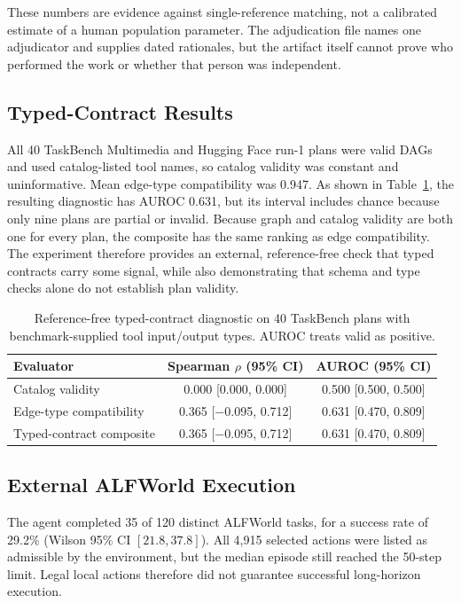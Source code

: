 \documentclass[10pt]{article}
\begin{document}
These numbers are evidence against single-reference matching, not a calibrated
estimate of a human population parameter. The adjudication file names one
adjudicator and supplies dated rationales, but the artifact itself cannot prove
who performed the work or whether that person was independent.

\subsection{Typed-Contract Results}
All 40 TaskBench Multimedia and Hugging Face run-1 plans were valid DAGs and
used catalog-listed tool names, so catalog validity was constant and
uninformative. Mean edge-type compatibility was 0.947. As shown in
Table~\ref{tab:typedcontracts}, the resulting diagnostic has AUROC 0.631, but
its interval includes chance because only nine plans are partial or invalid.
Because graph and catalog validity are both one for every plan, the composite
has the same ranking as edge compatibility. The experiment therefore provides
an external, reference-free check that typed contracts carry some signal, while
also demonstrating that schema and type checks alone do not establish plan
validity.

\begin{table}[t]
\centering
\caption{Reference-free typed-contract diagnostic on 40 TaskBench plans with
benchmark-supplied tool input/output types. AUROC treats valid as positive.}
\label{tab:typedcontracts}
\begin{tabular}{lcc}
\toprule
Evaluator & Spearman $\rho$ (95\% CI) & AUROC (95\% CI) \\
\midrule
Catalog validity & 0.000 [0.000, 0.000] & 0.500 [0.500, 0.500] \\
Edge-type compatibility & 0.365 [$-$0.095, 0.712] & 0.631 [0.470, 0.809] \\
Typed-contract composite & 0.365 [$-$0.095, 0.712] & 0.631 [0.470, 0.809] \\
\bottomrule
\end{tabular}
\end{table}

\subsection{External ALFWorld Execution}
The agent completed 35 of 120 distinct ALFWorld tasks, for a success rate of
29.2\% (Wilson 95\% CI $[21.8,37.8]$). All 4,915 selected actions were listed
as admissible by the environment, but the median episode still reached the
50-step limit. Legal local actions therefore did not guarantee successful
long-horizon execution.
\end{document}
